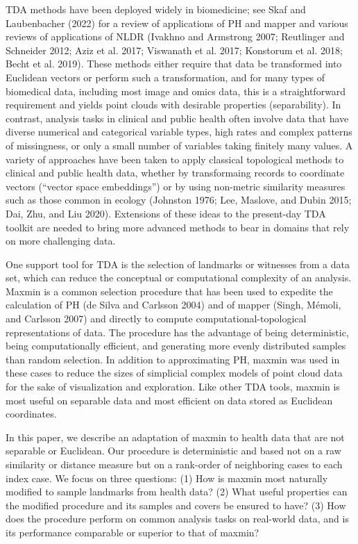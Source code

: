 \documentclass{article}
\begin{document}
TDA methods have been deployed widely in biomedicine; see Skaf and
Laubenbacher (2022) for a review of applications of PH and mapper and
various reviews of applications of NLDR (Ivakhno and Armstrong 2007;
Reutlinger and Schneider 2012; Aziz et al. 2017; Viswanath et al. 2017;
Konstorum et al. 2018; Becht et al. 2019). These methods either require
that data be transformed into Euclidean vectors or perform such a
transformation, and for many types of biomedical data, including most
image and omics data, this is a straightforward requirement and yields
point clouds with desirable properties (separability). In contrast,
analysis tasks in clinical and public health often involve data that
have diverse numerical and categorical variable types, high rates and
complex patterns of missingness, or only a small number of variables
taking finitely many values. A variety of approaches have been taken to
apply classical topological methods to clinical and public health data,
whether by transformaing records to coordinate vectors (``vector space
embeddings'') or by using non-metric similarity measures such as those
common in ecology (Johnston 1976; Lee, Maslove, and Dubin 2015; Dai,
Zhu, and Liu 2020). Extensions of these ideas to the present-day TDA
toolkit are needed to bring more advanced methods to bear in domains
that rely on more challenging data.

One support tool for TDA is the selection of landmarks or witnesses from
a data set, which can reduce the conceptual or computational complexity
of an analysis. Maxmin is a common selection procedure that has been
used to expedite the calculation of PH (de Silva and Carlsson 2004) and
of mapper (Singh, Mémoli, and Carlsson 2007) and directly to compute
computational-topological representations of data. The procedure has the
advantage of being deterministic, being computationally efficient, and
generating more evenly distributed samples than random selection. In
addition to approximating PH, maxmin was used in these cases to reduce
the sizes of simplicial complex models of point cloud data for the sake
of visualization and exploration. Like other TDA tools, maxmin is most
useful on separable data and most efficient on data stored as Euclidean
coordinates.

In this paper, we describe an adaptation of maxmin to health data that
are not separable or Euclidean. Our procedure is deterministic and based
not on a raw similarity or distance measure but on a rank-order of
neighboring cases to each index case. We focus on three questions: (1)
How is maxmin most naturally modified to sample landmarks from health
data? (2) What useful properties can the modified procedure and its
samples and covers be ensured to have? (3) How does the procedure
perform on common analysis tasks on real-world data, and is its
performance comparable or superior to that of maxmin?
\end{document}
